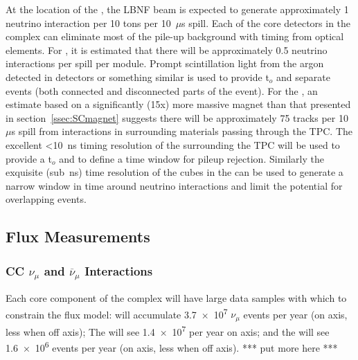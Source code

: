 At the location of the  , the LBNF beam is expected to generate approximately 1 neutrino interaction per 10 tons per 10~$\mu$s spill.   
Each of the core detectors in the  complex can eliminate most of the pile-up background with timing from optical elements. For , it is estimated that there will be approximately 0.5 neutrino interactions per spill per  module. Prompt scintillation light from the argon detected in  detectors or something similar is used to provide t$_{o}$ and separate events (both connected and disconnected parts of the event).  For the , an estimate based on a significantly (15x) more massive magnet than that presented in section~\ref{ssec:SCmagnet} suggests there will be approximately 75 tracks per 10~$\mu$s spill from interactions in surrounding materials passing through the TPC.  The excellent <10~ns timing resolution of the  surrounding the TPC will be used to provide a t$_{o}$ and to define a time window for pileup rejection.  Similarly the exquisite (sub~ns) time resolution of the cubes in the  can be used to generate a narrow window in time around neutrino interactions and limit the potential for overlapping events.  


\subsection{Flux Measurements}
\subsubsection{CC $\nu_{\mu}$ and $\overline{\nu}_{\mu}$ Interactions}
Each core component of the  complex will have large data samples with which to constrain the flux model:   will accumulate \num{3.7e7}  $\nu_{\mu}$ events per year (on axis, less when off axis);  The  will see \num{1.4e7} per year on axis; and the  will see \num{1.6e6} events per year (on axis, less when off axis).  *** put more here ***



